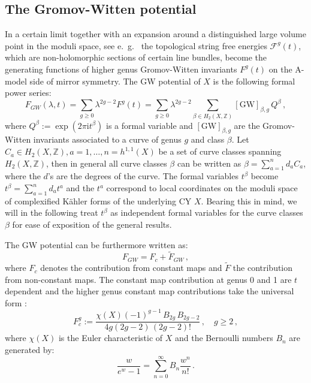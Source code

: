 \documentclass[a4paper,12pt,justification=centering]{article}
\numberwithin{equation}{section}
\newcommand{\I}{{\mathrm i}}
\theoremstyle{plain}%
\theoremstyle{definition}
\begin{document}
\subsection{The Gromov-Witten potential}
In a certain limit together with an expansion around a distinguished large volume point in the moduli space, see e.~g.~\cite{Bershadsky:1993cx} the topological string free energies $\mathcal{F}^{g}(t)$, which are non-holomorphic sections of certain line bundles, become the generating functions of higher genus Gromov-Witten invariants $F^g(t)$ on the A-model side of mirror symmetry. The GW potential of $X$ is the following formal power series:
\begin{equation}
F_{GW}(\lambda,t) = \sum_{g\ge 0}  \lambda^{2g-2} F^g(t)= \sum_{g\ge 0}  \lambda^{2g-2} \sum_{\beta\in H_2(X,\mathbb{Z})}  [\textrm{GW}]_{\beta,g} \,Q^{\beta}\, ,
\end{equation}
where $Q^{\beta} := \exp (2\pi \I t^{\beta} )$ is a formal variable and $[\textrm{GW}]_{\beta,g}$ are the Gromov-Witten invariants associated to a curve of genus $g$ and class $\beta$. Let $C_a \in H_{2}(X,\mathbb{Z}), a=1,\dots,n=h^{1,1}(X)$ be a set of curve classes spanning $H_2(X,\mathbb{Z})$, then in general all curve classes $\beta$ can be written as $\beta=\sum_{a=1}^{n} d_a C_a$, where the $d$'s are the degrees of the curve. The formal variables $t^{\beta}$ become $t^{\beta}=\sum_{a=1}^{n} d_a t^a$ and the $t^a$ correspond to local coordinates on the moduli space of complexified K\"ahler forms of the underlying CY $X$. Bearing this in mind, we will in the following treat $t^{\beta}$ as independent formal variables for the curve classes $\beta$ for ease of exposition of the general results.

The GW potential can be furthermore written as:
\begin{equation}
F_{GW}=F_c + \tilde{F}_{GW}\,,
\end{equation}
where $F_c$ denotes the contribution from constant maps and $ \tilde{F}$ the contribution from non-constant maps. The constant map contribution at genus 0 and 1 are $t$ dependent and the higher genus constant map contributions take the universal form \cite{Faber}:
\begin{equation}
F_c^g:= \frac{\chi(X)(-1)^{g-1}\, B_{2g}\, B_{2g-2}}{4g (2g-2)\, (2g-2)!}\,, \quad g\ge2\,,
\end{equation}
where $\chi(X)$ is the Euler characteristic of $X$ and the Bernoulli numbers $B_n$ are generated by:
\begin{equation}
\frac{w}{e^w-1} = \sum_{n=0}^{\infty} B_n \frac{w^n}{n!}\,.
\end{equation}
\end{document}
